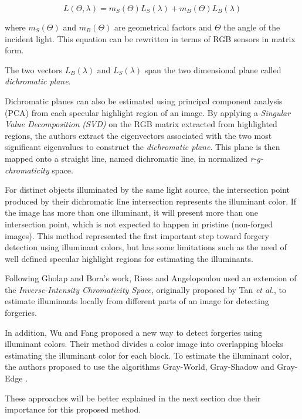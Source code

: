 \begin{equation} \label{eq:dichromaticmodel}
L(\Theta, \lambda) = m_S(\Theta) L_S(\lambda) + m_B(\Theta) L_B(\lambda)
\end{equation}

where $m_S(\Theta)$ and $m_B(\Theta)$ are geometrical factors and $\Theta$ the angle of the incident light. This equation can be rewritten in terms of RGB sensors in matrix form.

The two vectors $L_B(\lambda)$ and $L_S(\lambda)$ span the two dimensional plane called \emph{dichromatic plane}.

Dichromatic planes can also be estimated using principal component analysis (PCA) from each specular highlight region of an image. By applying a \emph{Singular Value Decomposition (SVD)} on the RGB matrix extracted from highlighted regions, the authors extract the eigenvectors associated with the two most significant eigenvalues to construct the \emph{dichromatic plane}. This plane is then mapped onto a straight line, named dichromatic line, in normalized \emph{r-g-chromaticity} space. 

For distinct objects illuminated by the same light source, the intersection point produced by their dichromatic line intersection represents the illuminant color. If the image has more than one illuminant, it will present more than one intersection point, which is not expected to happen in pristine (non-forged images). This method represented the first important step toward forgery detection using illuminant colors, but has some limitations such as the need of well defined specular highlight regions for estimating the illuminants.

Following Gholap and Bora’s work, Riess and Angelopoulou\cite{riess2010scene} used an extension of the \emph{Inverse-Intensity Chromaticity Space}, originally proposed by Tan \emph{et al.}\cite{tan2004color}, to estimate illuminants locally from different parts of an image for detecting forgeries.

In addition, Wu and Fang\cite{wu2011image} proposed a new way to detect forgeries using illuminant colors. Their method divides a color image into overlapping blocks estimating the illuminant color for each block. To estimate the illuminant color, the authors proposed to use the algorithms Gray-World, Gray-Shadow and Gray-Edge \cite{van2007edge}.

These approaches will be better explained in the next section due their importance for this proposed method.

